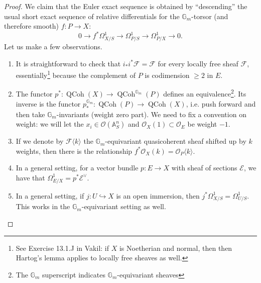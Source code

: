 \documentclass[10pt]{article}
\theoremstyle{definition}
\DeclareMathOperator{\Sym}{Sym}
\DeclareMathOperator{\QCoh}{QCoh}
\newcommand{\G}{\mathbb{G}}
\newcommand{\OO}{\mathcal{O}}
\begin{document}
\begin{proof}
We claim that the Euler exact sequence is obtained by ``descending'' the usual short exact sequence of relative differentials for the $\G_m$-torsor (and therefore smooth) $f: P \rightarrow X$:
$$0 \rightarrow f^* \Omega^1_{X/S} \rightarrow \Omega^1_{P/S} \rightarrow \Omega^1_{P/X} \rightarrow 0.$$
Let us make a few observations.
\begin{enumerate}
\item It is straightforward to check that $i_* i^* \mathcal{F} = \mathcal{F}$ for every locally free sheaf $\mathcal{F}$, essentially\footnote{See Exercise 13.1.J in Vakil: if $X$ is Noetherian and normal, then then Hartog's lemma applies to locally free sheaves as well.} because the complement of $P$ is codimension $\geq 2$ in $E$.
\item The functor $p^*: \QCoh(X) \rightarrow \QCoh^{\G_m}(P)$ defines an equivalence\footnote{The $\G_m$ superscript indicates $\G_m$-equivariant sheaves}.  Its inverse is the functor $p_*^{\G_m}: \QCoh(P) \rightarrow \QCoh(X)$, i.e. push forward and then take $\G_m$-invariants (weight zero part).   We need to fix a convention on weight: we will let the $x_i \in \OO(\mathbb{A}^n_S)$ and $\OO_X(1) \subset \OO_E$ be weight $-1$.%
\item If we denote by $\mathcal{F} \langle k \rangle$ the $\G_m$-equivariant quasicoherent sheaf shifted up by $k$ weights, then there is the relationship $f^* \OO_X(k) = \OO_P \langle k \rangle$.
\item In a general setting, for a vector bundle $p: E \rightarrow X$ with sheaf of sections $\mathcal{E}$, we have that $\Omega^1_{E/X} = p^* \mathcal{E}^\vee$.
\item In a general setting, if $j: U \hookrightarrow X$ is an open immersion, then $j^* \Omega^1_{X/S} = \Omega^1_{U/S}$.  This works in the $\G_m$-equivariant setting as well.
\end{enumerate}





\end{proof}
\end{document}

